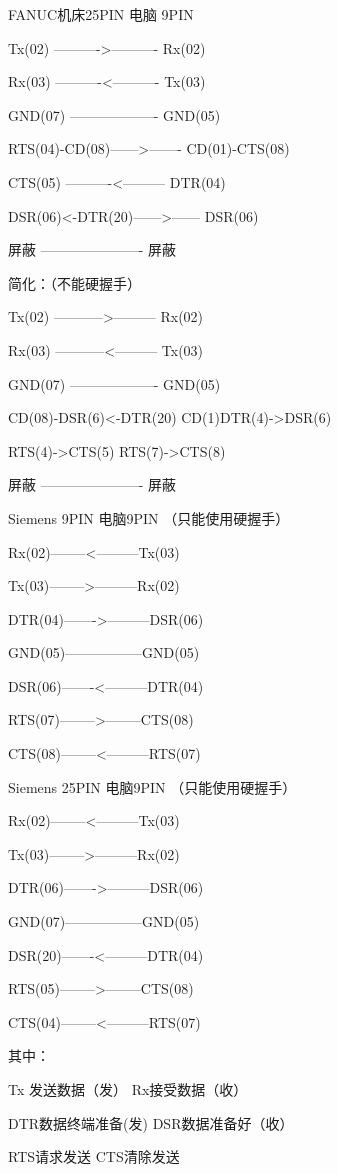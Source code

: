 FANUC机床25PIN    电脑 9PIN

Tx(02) ---------->---------- Rx(02)

Rx(03) ----------<---------- Tx(03)

GND(07) ------------------- GND(05)

RTS(04)-CD(08)------>------- CD(01)-CTS(08)

CTS(05) ----------<--------- DTR(04)

DSR(06)<-DTR(20)------>------ DSR(06)

屏蔽 ---------------------- 屏蔽

简化：（不能硬握手）

Tx(02) ----------->--------- Rx(02)

Rx(03) -----------<--------- Tx(03)

GND(07) ------------------- GND(05)

CD(08)-DSR(6)<-DTR(20)         CD(1)DTR(4)->DSR(6)

RTS(4)->CTS(5)                 RTS(7)->CTS(8)

屏蔽 ---------------------- 屏蔽

Siemens 9PIN      电脑9PIN  （只能使用硬握手）

Rx(02)--------<---------Tx(03)

Tx(03)-------->---------Rx(02)

DTR(04)------->---------DSR(06)

GND(05)-----------------GND(05)

DSR(06)-------<---------DTR(04)

RTS(07)-------->--------CTS(08)

CTS(08)--------<---------RTS(07)

Siemens 25PIN      电脑9PIN  （只能使用硬握手）

Rx(02)--------<---------Tx(03)

Tx(03)-------->---------Rx(02)

DTR(06)------->---------DSR(06)

GND(07)-----------------GND(05)

DSR(20)-------<---------DTR(04)

RTS(05)-------->--------CTS(08)

CTS(04)--------<---------RTS(07)

其中：

Tx 发送数据（发）          Rx接受数据（收）

DTR数据终端准备(发)     DSR数据准备好（收）

RTS请求发送          CTS清除发送

